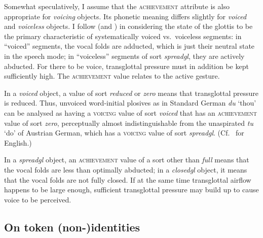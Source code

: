 \documentclass[output=paper]{langsci/langscibook}
\begin{document}
Somewhat speculatively, I assume that the \textsc{achievement} attribute is
also appropriate for \textit{voicing}\/ objects. Its phonetic meaning differs
slightly for \textit{voiced}\/ and \textit{voiceless}\/ objects. I follow
\cite{gol:bro:86} (and
\citealt[49\hspace*{1pt}ff.\@]{lad:mad:96}) in considering the state of the glottis to be
the primary characteristic of systematically voiced vs.\ voiceless
segments: in ``voiced'' segments, the vocal folds are adducted, which is
just their neutral state in the speech mode; in ``voiceless'' segments of
sort \textit{spreadgl}\/, they are actively abducted. For there to be voice,
transglottal pressure must in ad\-dition be kept sufficiently high. The
\textsc{achievement} value relates to the active gesture.

\addlines
In a \textit{voiced}\/ object, a value of sort \textit{reduced}\/ or \textit{zero}\/
means that transglottal pressure is reduced. Thus, unvoiced word-initial
plosives as in Standard German \textipa{[\r*du:]}
\emph{du} `thou' can be analysed as having a \textsc{voicing} value of sort
\textit{voiced}\/ that has an \textsc{achievement} value of sort \textit{zero},
perceptually almost indistinguishable from the unaspirated \textipa{[tu:]}
\emph{tu} `do' of Austrian German, which has a \textsc{voicing} value of sort \textit{spreadgl}.  (Cf.\ \citealt{fleg:82} for English.)

In a \textit{spreadgl}\/ object, an \textsc{achievement} value of a sort other
than \textit{full}\/ means that the vocal folds are less than optimally
abducted; in a \textit{closedgl}\/ object, it means that the vocal folds are
not fully closed. If at the same time transglottal airflow happens to be
large enough, sufficient transglottal pressure may build up to cause voice
to be perceived. 



\subsection{On token (non-)identities}
\label{sec:1.2.4}
\end{document}
